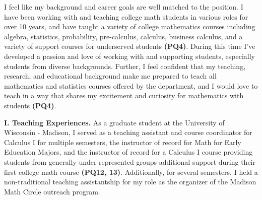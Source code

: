 \documentclass[11pt]{article}
\begin{document}

I feel like my background and career goals are well matched to the position. I have been working with and teaching college math students in various roles for over 10 years, and have taught a variety of college mathematics courses including algebra, statistics, probability, pre-calculus, calculus, business calculus, and a variety of support courses for underserved students \textbf{(PQ4)}. During this time I've developed a passion and love of working with and supporting students, especially students from diverse backgrounds. Further, I feel confident that my teaching, research, and educational background make me prepared to teach all mathematics and statistics courses offered by the department, and I would love to teach in a way that shares my excitement and curiosity for mathematics with students \textbf{(PQ4)}. 

\noindent \textbf{I. Teaching Experiences.} As a graduate student at the University of Wisconsin - Madison, I served as a teaching assistant and course coordinator for Calculus I for multiple semesters, the instructor of record for Math for Early Education Majors, and the instructor of record for a Calculus I course providing students from generally under-represented groups additional support during their first college math course \textbf{(PQ12, 13)}. Additionally, for several semesters, I held a non-traditional teaching assistantship for my role as the organizer of the Madison Math Circle outreach program. %
\end{document}
